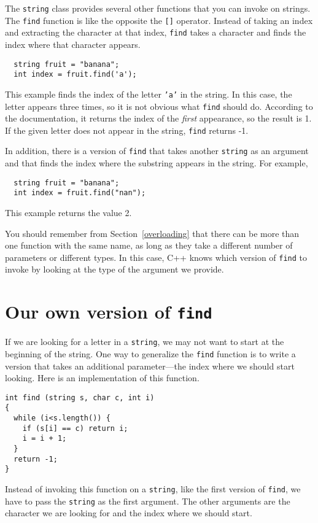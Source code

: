 The {\tt string} class provides several other functions that you can
invoke on strings.  The {\tt find} function is like the opposite the
{\tt []} operator.  Instead of taking an index and extracting the
character at that index, {\tt find} takes a character and finds the
index where that character appears.

\begin{verbatim}
  string fruit = "banana";
  int index = fruit.find('a');
\end{verbatim}
%
This example finds the index of the letter {\tt 'a'} in the string.
In this case, the letter appears three times, so it is not obvious
what {\tt find} should do.  According to the documentation, it returns
the index of the {\em first} appearance, so the result is 1.  If the
given letter does not appear in the string, {\tt find} returns -1.

In addition, there is a
version of {\tt find} that takes another {\tt string} as
an argument and that finds the index where the substring
appears in the string.  For example,

\begin{verbatim}
  string fruit = "banana";
  int index = fruit.find("nan");
\end{verbatim}
%
This example returns the value 2.

You should remember from Section~\ref{overloading} that there
can be more than one function with the same name, as long as they
take a different number of parameters or different types.  In
this case, C++ knows which version of {\tt find} to invoke
by looking at the type of the argument we provide.

\section{Our own version of {\tt find}}

If we are looking for a letter in a {\tt string}, we may
not want to start at the beginning of the string.  One way
to generalize the {\tt find} function is to write a version
that takes an additional parameter---the index where we should
start looking.  Here is an implementation of this function.

\begin{verbatim}
int find (string s, char c, int i)
{
  while (i<s.length()) {
    if (s[i] == c) return i;
    i = i + 1;
  }
  return -1;
}
\end{verbatim}
%
Instead of invoking this function on a {\tt string}, like
the first version of {\tt find}, we have to pass the {\tt string}
as the first argument.  The other arguments are the character
we are looking for and the index where we should start.


